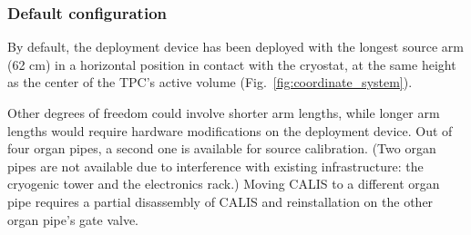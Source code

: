 
\subsubsection*{Default configuration}
By default, the deployment device has been deployed with the longest source arm (62 cm) in a horizontal position in contact with the cryostat, at the same height as the center of the TPC's active volume (Fig.~\ref{fig:coordinate_system}). 

Other degrees of freedom could involve shorter arm lengths, while longer arm lengths would require hardware modifications on the deployment device. Out of four organ pipes, a second one is available for source calibration. (Two organ pipes are not available due to interference with existing infrastructure: the cryogenic tower and the electronics rack.) Moving CALIS to a different organ pipe requires a partial disassembly of CALIS and reinstallation on the other organ pipe's gate valve.

